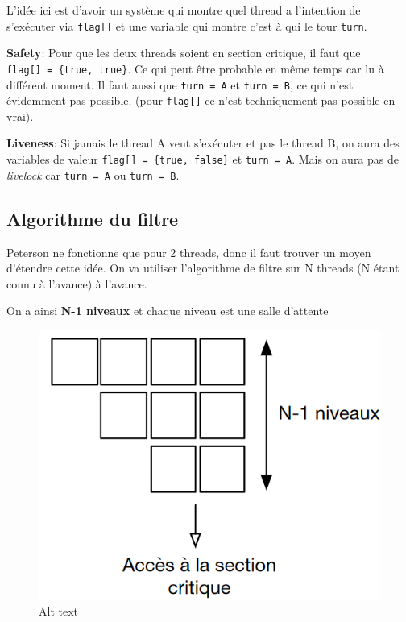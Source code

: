 L'idée ici est d'avoir un système qui montre quel thread a l'intention
de s'exécuter via \texttt{flag{[}{]}} et une variable qui montre c'est à
qui le tour \texttt{turn}.

\textbf{Safety}: Pour que les deux threads soient en section critique,
il faut que \texttt{flag{[}{]}\ =\ \{true,\ true\}}. Ce qui peut être
probable en même temps car lu à différent moment. Il faut aussi que
\texttt{turn\ =\ A} et \texttt{turn\ =\ B}, ce qui n'est évidemment pas
possible. (pour \texttt{flag{[}{]}} ce n'est techniquement pas possible
en vrai).

\textbf{Liveness}: Si jamais le thread A veut s'exécuter et pas le
thread B, on aura des variables de valeur
\texttt{flag{[}{]}\ =\ \{true,\ false\}} et \texttt{turn\ =\ A}. Mais on
aura pas de \emph{livelock} car \texttt{turn\ =\ A} ou
\texttt{turn\ =\ B}.

\subsection{Algorithme du filtre}\label{algorithme-du-filtre}

Peterson ne fonctionne que pour 2 threads, donc il faut trouver un moyen
d'étendre cette idée. On va utiliser l'algorithme de filtre sur N
threads (N étant connu à l'avance) à l'avance.

On a ainsi \textbf{N-1 niveaux} et chaque niveau est une salle d'attente

\begin{figure}
\centering
\includegraphics{image-25.png}
\caption{Alt text}
\end{figure}

